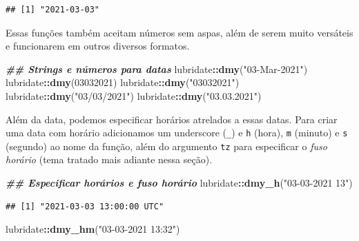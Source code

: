 \documentclass[
]{article}
\newenvironment{Shaded}{\begin{snugshade}}{\end{snugshade}}
\newcommand{\DecValTok}[1]{\textcolor[rgb]{0.00,0.00,0.81}{#1}}
\newcommand{\DocumentationTok}[1]{\textcolor[rgb]{0.56,0.35,0.01}{\textbf{\textit{#1}}}}
\newcommand{\FunctionTok}[1]{\textcolor[rgb]{0.13,0.29,0.53}{\textbf{#1}}}
\newcommand{\NormalTok}[1]{#1}
\newcommand{\SpecialCharTok}[1]{\textcolor[rgb]{0.81,0.36,0.00}{\textbf{#1}}}
\newcommand{\StringTok}[1]{\textcolor[rgb]{0.31,0.60,0.02}{#1}}
\begin{document}
\begin{verbatim}
## [1] "2021-03-03"
\end{verbatim}

Essas funções também aceitam números sem aspas, além de serem muito versáteis e funcionarem em outros diversos formatos.

\begin{Shaded}
\begin{Highlighting}[]
\DocumentationTok{\#\# Strings e números para datas}
\NormalTok{lubridate}\SpecialCharTok{::}\FunctionTok{dmy}\NormalTok{(}\StringTok{"03{-}Mar{-}2021"}\NormalTok{)}
\NormalTok{lubridate}\SpecialCharTok{::}\FunctionTok{dmy}\NormalTok{(}\DecValTok{03032021}\NormalTok{)}
\NormalTok{lubridate}\SpecialCharTok{::}\FunctionTok{dmy}\NormalTok{(}\StringTok{"03032021"}\NormalTok{)}
\NormalTok{lubridate}\SpecialCharTok{::}\FunctionTok{dmy}\NormalTok{(}\StringTok{"03/03/2021"}\NormalTok{)}
\NormalTok{lubridate}\SpecialCharTok{::}\FunctionTok{dmy}\NormalTok{(}\StringTok{"03.03.2021"}\NormalTok{)}
\end{Highlighting}
\end{Shaded}

Além da data, podemos especificar horários atrelados a essas datas. Para criar uma data com horário adicionamos um underscore (\texttt{\_}) e \texttt{h} (hora), \texttt{m} (minuto) e \texttt{s} (segundo) ao nome da função, além do argumento \texttt{tz} para especificar o \emph{fuso horário} (tema tratado mais adiante nessa seção).

\begin{Shaded}
\begin{Highlighting}[]
\DocumentationTok{\#\# Especificar horários e fuso horário}
\NormalTok{lubridate}\SpecialCharTok{::}\FunctionTok{dmy\_h}\NormalTok{(}\StringTok{"03{-}03{-}2021 13"}\NormalTok{)}
\end{Highlighting}
\end{Shaded}

\begin{verbatim}
## [1] "2021-03-03 13:00:00 UTC"
\end{verbatim}

\begin{Shaded}
\begin{Highlighting}[]
\NormalTok{lubridate}\SpecialCharTok{::}\FunctionTok{dmy\_hm}\NormalTok{(}\StringTok{"03{-}03{-}2021 13:32"}\NormalTok{)}
\end{Highlighting}
\end{Shaded}
\end{document}
